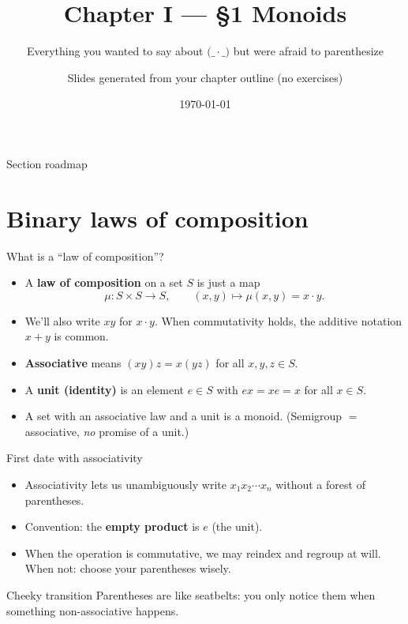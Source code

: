 \documentclass[aspectratio=169,11pt]{beamer}
\title{Chapter I — \S1 Monoids}
\subtitle{Everything you wanted to say about $\big(\_\!\cdot\!\_\big)$ but were afraid to parenthesize}
\author{Slides generated from your chapter outline (no exercises)}
\date{\today}
\begin{document}
\maketitle

\begin{frame}{Section roadmap}
\tableofcontents
\end{frame}

\section{Binary laws of composition}
\begin{frame}{What is a ``law of composition''?}
\begin{itemize}
  \item A \textbf{law of composition} on a set $S$ is just a map
  \[
    \mu : S\times S \longrightarrow S,\qquad (x,y)\mapsto \mu(x,y)=x\cdot y.
  \]
  \item We'll also write $xy$ for $x\cdot y$. When commutativity holds, the additive notation $x+y$ is common.
  \item \textbf{Associative} means $(xy)z=x(yz)$ for all $x,y,z\in S$.
  \item A \textbf{unit (identity)} is an element $e\in S$ with $ex=xe=x$ for all $x\in S$.
  \item A set with an associative law and a unit is a \alert{monoid}. (Semigroup $=$ associative, \emph{no} promise of a unit.)
\end{itemize}
\end{frame}

\begin{frame}{First date with associativity}
\begin{itemize}
  \item Associativity lets us unambiguously write $x_1x_2\cdots x_n$ without a forest of parentheses.
  \item Convention: the \textbf{empty product} is $e$ (the unit).
  \item When the operation is commutative, we may reindex and regroup at will. When not: choose your parentheses wisely.
\end{itemize}
\begin{block}{Cheeky transition}
Parentheses are like seatbelts: you only notice them when something non-associative happens.
\end{block}
\end{frame}
\end{document}
